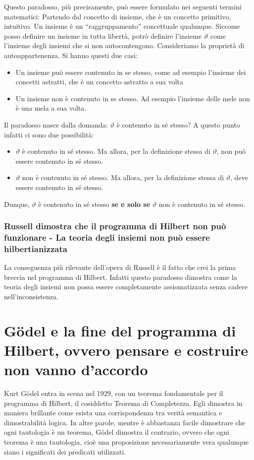 \documentclass[a4paper,10pt]{article}
\begin{document}
Questo paradosso, più precisamente, può essere formulato nei seguenti termini matematici:
Partendo dal concetto di insieme, che è un concetto primitivo, intuitivo. Un insieme è un “raggruppamento” concettuale qualunque. Siccome posso definire un insieme in tutta libertà, potrò definire l'insieme $\vartheta$ come l'insieme degli insiemi che si non autocontengono. Consideriamo la proprietà di autoappartenenza. Si hanno questi due casi:
\begin{itemize}
 \item Un insieme può essere contenuto in se stesso, come ad esempio l'insieme dei concetti astratti, che è un concetto astratto a sua volta
 \item Un insieme non è contenuto in se stesso. Ad esempio l'insieme delle mele non è una mela a sua volta.
\end{itemize}
Il paradosso nasce dalla domanda: $\vartheta$ è contenuto in sé stesso?
A questo punto infatti ci sono due possibilità:
\begin{itemize}
 \item $\vartheta$ è contenuto in sé stesso. Ma allora, per la definizione stessa di $\vartheta$, non può essere contenuto in sé stesso.
 \item $\vartheta$ non è contenuto in sé stesso.  Ma allora, per la definizione stessa di $\vartheta$, deve essere contenuto in sé stesso.
\end{itemize}

Dunque, $\vartheta$ è contenuto in sé stesso \textbf{se e solo se}  $\vartheta$ non è contenuto in sé stesso.


\subsubsection{Russell dimostra che il programma di Hilbert non può funzionare - La teoria degli insiemi non può essere hilbertianizzata}
La conseguenza più rilevante dell'opera di Russell è il fatto che crei la prima breccia nel programma di Hilbert. Infatti questo paradosso dimostra come la teoria degli insiemi non possa essere completamente assiomatizzata senza cadere nell'inconsistenza.

\section{Gödel e la fine del programma di Hilbert, ovvero pensare e costruire non vanno d'accordo}
Kurt Gödel entra in scena nel 1929, con un teorema fondamentale per il programma di Hilbert, il cosiddetto Teorema di Completezza. Egli dimostra in maniera brillante come esista una corrispondenza tra verità semantica e dimostrabilità logica. In altre parole, mentre è abbastanza facile dimostrare che ogni tautologia è un teorema, Gödel dimostra il contrario, ovvero che ogni teorema è una tautologia, cioè una proposizione necessariamente vera qualunque siano i significati dei predicati utilizzati.
\end{document}
